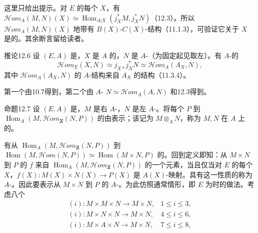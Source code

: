 这里只给出提示。对 $E$ 的每个 $X$，有 $\mathscr{H}\!om_A(M,N)(X)\simeq\operatorname{Hom}_{A|X}(j_X^*M,j_X^*N)$（12.3）。所以 $\mathscr{H}\!om_A(M,N)(X)$ 地带有 $B(X)$-$C(X)$-结构（11.1.3），可验证它关于 $X$ 是的。其余断言留给读者。
\begin{SGAresult}{推论}{12.6}
设 $(E,A)$ 是，$X$ 是 $A$ 的，$N$ 是 $A$-（为固定起见取左）。有 $A$-的
\[\mathscr{H}\!om_E(X,N)\simeq j_{X*}j_X^*N\simeq\mathscr{H}\!om_A(A_X,N),\]
其中 $\mathscr{H}\!om_A(A_X,N)$ 的 $A$-结构来自 $A_X$ 的结构（11.3.4）。
\end{SGAresult}
第一个由10.7得到，第二个由 $A$- $N\simeq\mathscr{H}\!om_A(A,N)$ 和12.3得到。
\begin{SGAresult}{命题}{12.7}
设 $(E,A)$ 是，$M$ 是右 $A$-，$N$ 是左 $A$-。将每个 $P$ 到 $\operatorname{Hom}_A(M,\mathscr{H}\!om_{\mathbf Z}(N,P))$ 的由表示；该记为 $M\otimes_A N$，称为 $M,N$ 在 $A$ 上的。
\end{SGAresult}
有从 $\operatorname{Hom}_A(M,\mathscr{H}\!om_{\mathbf Z}(N,P))$ 到 $\operatorname{Hom}(M,\mathscr{H}\!om(N,P))\simeq\operatorname{Hom}(M\times N,P)$ 的。回到定义即知：从 $M\times N$ 到 $P$ 的 $f$ 来自 $\operatorname{Hom}_A(M,\mathscr{H}\!om_{\mathbf Z}(N,P))$ 的一个元素，当且仅当对 $E$ 的每个 $X$，$f(X):M(X)\times N(X)\to P(X)$ 是 $A(X)$-映射。具有这一性质的称为 $A$-。因此要表示从 $M\times N$ 到 $P$ 的 $A$-。为此仿照通常情形，即 $E$ 为时的做法。考虑八个
\[
\begin{array}{lll}
(i):M\times M\times N\longrightarrow M\times N,&1\leq i\leq3,\\
(i):M\times N\times N\longrightarrow M\times N,&4\leq i\leq6,\\
(i):M\times A\times N\longrightarrow M\times N,&7\leq i\leq8,
\end{array}
\]
